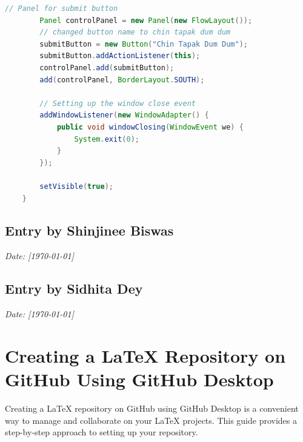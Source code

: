 \documentclass[12pt, a4paper]{article}
\begin{document}
\begin{lstlisting}[language=Java, caption=Java Swing Application Code]
        // Panel for submit button
        Panel controlPanel = new Panel(new FlowLayout());
        // changed button name to chin tapak dum dum
        submitButton = new Button("Chin Tapak Dum Dum"); 
        submitButton.addActionListener(this);
        controlPanel.add(submitButton);
        add(controlPanel, BorderLayout.SOUTH);

        // Setting up the window close event
        addWindowListener(new WindowAdapter() {
            public void windowClosing(WindowEvent we) {
                System.exit(0);
            }
        });

        setVisible(true);
    }
\end{lstlisting}


\newpage
{}
\vspace{-2cm}
\subsection*{Entry by Shinjinee Biswas}
\textit{Date: [\today]}\\

\newpage
{}
\vspace{-2cm}
\subsection*{Entry by Sidhita Dey}
\textit{Date: [\today]}\\
\centering
\section*{\textcolor{blue!60}{\Huge Creating a LaTeX Repository on GitHub Using GitHub Desktop}}

\vspace{0.8cm}

\textmd{Creating a LaTeX repository on GitHub using GitHub Desktop is a convenient way to manage and collaborate on your LaTeX projects. This guide provides a step-by-step approach to setting up your repository.}
\end{document}
